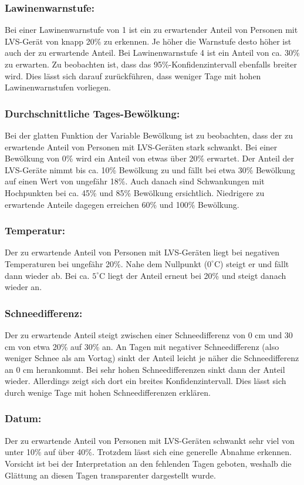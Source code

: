 \documentclass[12pt]{scrreprt}
\begin{document}
\subsubsection*{Lawinenwarnstufe:}
Bei einer Lawinenwarnstufe von 1 ist ein zu erwartender Anteil von Personen mit LVS-Gerät von knapp 20\% zu erkennen. Je höher die Warnstufe desto höher ist auch der zu erwartende Anteil. Bei Lawinenwarnstufe 4 ist ein Anteil von ca. 30\% zu erwarten. Zu beobachten ist, dass das 95\%-Konfidenzintervall ebenfalls breiter wird. Dies lässt sich darauf zurückführen, dass weniger Tage mit hohen Lawinenwarnstufen vorliegen.
\subsubsection*{Durchschnittliche Tages-Bewölkung:}
Bei der glatten Funktion der Variable Bewölkung ist zu beobachten, dass der zu erwartende Anteil von Personen mit LVS-Geräten stark schwankt. Bei einer Bewölkung von 0\% wird ein Anteil von etwas über 20\% erwartet. Der Anteil der LVS-Geräte nimmt bis ca. 10\% Bewölkung zu und fällt bei etwa 30\% Bewölkung auf einen Wert von ungefähr 18\%. Auch danach sind Schwankungen mit Hochpunkten bei ca. 45\% und 85\% Bewölkung ersichtlich. Niedrigere zu erwartende Anteile dagegen erreichen 60\% und 100\% Bewölkung.
\subsubsection*{Temperatur:}
Der zu erwartende Anteil von Personen mit LVS-Geräten liegt bei negativen Temperaturen bei ungefähr 20\%. Nahe dem Nullpunkt ($0^\circ$C) steigt er und fällt dann wieder ab. Bei ca. $5^\circ$C liegt der Anteil erneut bei 20\% und steigt danach wieder an.
\subsubsection*{Schneedifferenz:}
Der zu erwartende Anteil steigt zwischen einer Schneedifferenz von 0 cm und 30 cm von etwa 20\% auf 30\% an. An Tagen mit negativer Schneedifferenz (also weniger Schnee als am Vortag) sinkt der Anteil leicht je näher die Schneedifferenz an 0 cm herankommt. Bei sehr hohen Schneedifferenzen sinkt dann der Anteil wieder. Allerdings zeigt sich dort ein breites Konfidenzintervall. Dies lässt sich durch wenige Tage mit hohen Schneedifferenzen erklären.
\subsubsection*{Datum:}
Der zu erwartende Anteil von Personen mit LVS-Geräten schwankt sehr viel von unter 10\% auf über 40\%. Trotzdem lässt sich eine generelle Abnahme erkennen. Vorsicht ist bei der Interpretation an den fehlenden Tagen geboten, weshalb die Glättung an diesen Tagen transparenter dargestellt wurde.
\end{document}
